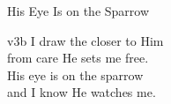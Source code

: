 \begin{song}{His Eye Is on the Sparrow}
    \begin{songframe}{v3b}
        I draw the closer to Him \\
        from care He sets me free. \\
        His eye is on the sparrow \\
        and I know He watches me.
    \end{songframe}


\end{song}
\endinput
